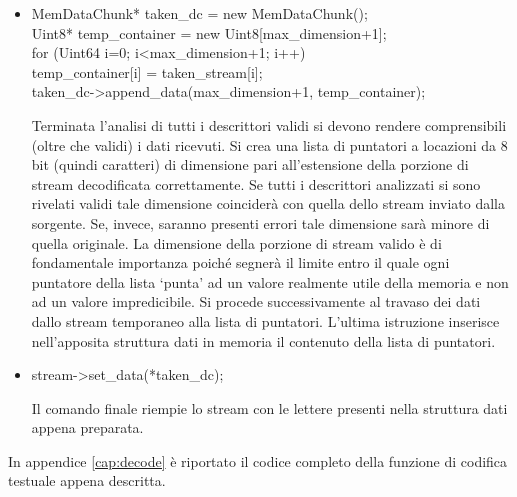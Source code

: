 \begin{itemize}
 \item \begin{code}
MemDataChunk* taken\_dc = new MemDataChunk();\\
Uint8* temp\_container = new Uint8[max\_dimension+1];\\
for (Uint64 i=0; i<max\_dimension+1; i++)\\
	temp\_container[i] = taken\_stream[i];\\
taken\_dc->append\_data(max\_dimension+1, temp\_container);\\
\end{code}
Terminata l'analisi di tutti i descrittori validi si devono rendere
comprensibili (oltre che validi) i dati ricevuti. Si crea una lista di
puntatori a locazioni da 8 bit (quindi caratteri) di dimensione pari
all'estensione della porzione di stream decodificata correttamente. Se tutti i
descrittori analizzati si sono rivelati validi tale dimensione coinciderà con
quella dello stream inviato dalla sorgente. Se, invece, saranno presenti errori tale dimensione sarà minore di quella originale. La dimensione della porzione di stream valido è di fondamentale importanza poiché segnerà il limite entro il quale ogni puntatore della lista `punta' ad un valore realmente utile della memoria e non ad un valore impredicibile. Si procede successivamente al travaso dei dati dallo stream temporaneo alla lista di puntatori. L'ultima istruzione inserisce nell'apposita struttura dati in memoria il contenuto della lista di puntatori.

 \item \begin{code}
stream->set\_data(*taken\_dc);\\
\end{code}
Il comando finale riempie lo stream con le lettere presenti nella struttura dati appena preparata.
\end{itemize}
In appendice \ref{cap:decode} è riportato il codice completo della funzione di
codifica testuale appena descritta.

